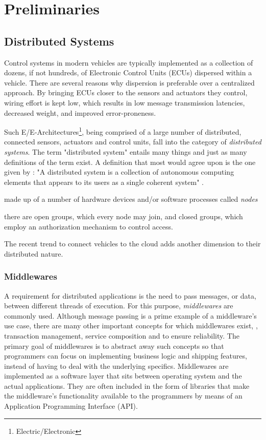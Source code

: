 

\chapter{Preliminaries}\label{chapter:preliminaries}


\section{Distributed Systems}

Control systems in modern vehicles are typically implemented as a collection of dozens, if not hundreds, of Electronic Control Units (ECUs) dispersed within a vehicle. There are several reasons why dispersion is preferable over a centralized approach. By bringing ECUs closer to the sensors and actuators they control, wiring effort is kept low, which results in low message transmission latencies, decreased weight, and improved error-proneness. 

Such E/E-Architectures\footnote{Electric/Electronic}, being comprised of a large number of distributed, connected sensors, actuators and control units, fall into the category of \emph{distributed systems}. The term "distributed system" entails many things and just as many definitions of the term exist. A definition that most would agree upon is the one given by \citeauthor*{tanenbaum2017distributed}: "A distributed system is a collection of autonomous computing elements that appears to its users as a single coherent system" \cite{tanenbaum2017distributed}.


made up of a number of hardware devices and/or software processes called \emph{nodes}

there are open groups, which every node may join, and closed groups, which employ an authorization mechanism to control access.

The recent trend to connect vehicles to the cloud adds another dimension to their distributed nature.

\subsection{Middlewares}
A requirement for distributed applications is the need to pass messages, or data, between different threads of execution. For this purpose, \emph{middlewares} \cite{bernstein1996middleware} are commonly used. Although message passing is a prime example of a middleware's use case, there are many other important concepts for which middlewares exist, \eg , transaction management, service composition and to ensure reliability. The primary goal of middlewares is to abstract away such concepts so that programmers can focus on implementing business logic and shipping features, instead of having to deal with the underlying specifics. Middlewares are implemented as a software layer that sits between operating system and the actual applications. They are often included in the form of libraries that make the middleware's functionality available to the programmers by means of an Application Programming Interface (API).


